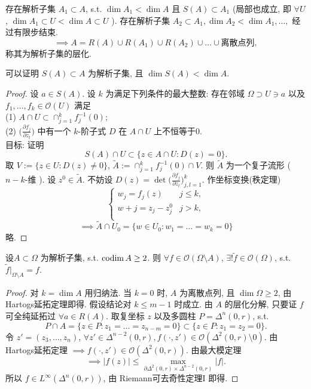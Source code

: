 \begin{theorem}[解析子集的层化]
  存在解析子集 $A_1 \subset A$, s.t. $\dim A_1 <\dim A$ 且 $S(A) \subset A_1$ (局部也成立, 即 $\forall U$, $\dim A_1 \subset U <\dim A \subset U$  ).
  存在解析子集 $A_2 \subset A_1,\dim A_2 < \dim A_1,\dots,$ 经过有限步结束. 
  $$ \implies A= R(A) \cup R(A_1) \cup R(A_2) \cup \dots \cup \text{离散点列}, $$    
  称其为解析子集的层化.
\end{theorem}
\begin{remark}
  可以证明 $S(A) \subset A$ 为解析子集, 且 $\dim S(A) < \dim A$.  
\end{remark}
\begin{proof}
  设 $a \in S(A)$. 设 $k$ 为满足下列条件的最大整数: 存在邻域 $\Omega \supset U \ni a$  以及 $f_1,\dots,f_k \in \mathcal{O}(U)$ 满足\\
   (1) $A \cap U \subset  \cap _{j=1}^{k} f_{j}^{-1}(0)$; \\
   (2) $\big(\frac{\partial f_j}{\partial z_l}\big)$ 中有一个 $k$-阶子式 $D$ 在 $A \cap U$ 上不恒等于0.      \\
   目标: 证明 
   $$ S(A) \cap U \subset \{z \in A \cap U:D(z)=0\} .$$
   取 $V:=\{z \in U: D(z) \neq 0\}$, $\tilde{A}:=\cap _{j=1}^{k} f_{j}^{-1}(0) \cap V$. 则 $\tilde{A}$ 为一个复子流形 ($n-k$-维 ). 设 $z^0 \in \tilde{A}$. 不妨设 $D(z)=\det \big(\frac{\partial f_j}{\partial z_l}\big)_{j,l=1}^{k}$. 作坐标变换(秩定理)
   $$ \begin{cases}
    w_j=f_j(z) &\text{} j \leq k,\\
    w+j=z_j-z_{j}^{0} &\text{} j>k,\\
   \end{cases}  $$  
   $$\implies  \tilde{A} \cap U_0=\{w \in U_0: w_1=\dots=w_k=0\}$$    
   略.
\end{proof}

\begin{theorem}[Riemann可去奇性定理II]
  设$A \subset \Omega $ 为解析子集, s.t. $\operatorname{codim} A \geq 2$. 则 $\forall f \in \mathcal{O}(\Omega  \setminus A)$, $\exists ! \tilde{f} \in \mathcal{O}(\Omega )$, s.t. $\tilde{f}|_{\Omega \setminus A}=f$.     
\end{theorem}
\begin{proof}
  对 $k=\dim A$ 用归纳法. 
  当 $k=0$ 时, $A$ 为离散点列, 且 $\dim \Omega \geq 2$, 由 Hartogs延拓定理即得. 假设结论对 $k \leq m-1$ 时成立. 
  由 $A$ 的层化分解, 只要证 $f$ 可全纯延拓过 $\forall a \in R(A)$. 取复坐标 $z$ 以及多圆柱 $P=\Delta ^n(0,r)$, s.t. 
  $$ P \cap A =\{z \in P: z_1=\dots=z_{n-m}=0\} \subset \{z \in P: z_1=z_2=0\}. $$   
  令 $z'=(z_3,\dots,z_n)$, $\forall  z' \in \Delta ^{n-2}(0,r), f(\cdot ,z') \in \mathcal{O}(\Delta ^{2}(0,r)\setminus 0).$ 由 Hartogs延拓定理 $\implies f(\cdot ,z') \in \mathcal{O}(\Delta ^{2}(0,r))$. 由最大模定理 $$\implies |f(z)| \leq \max_{\partial \Delta ^{2}(0,r) \times \Delta ^{n-2}(0,r)}|f|.$$           
  所以 $f \in L^{\infty }(\Delta ^{n}(0,r))$, 由 Riemann可去奇性定理I 即得. 
\end{proof}

